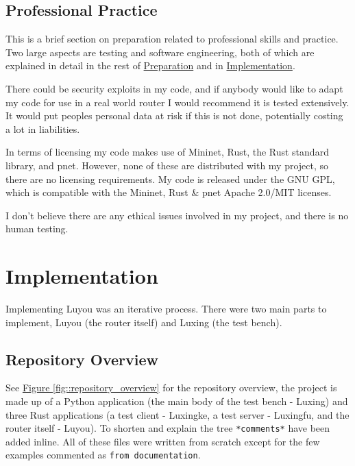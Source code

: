 \documentclass[12pt,a4paper,twoside,openright]{report}
\begin{document}
\section{Professional Practice}
This is a brief section on preparation related to professional skills and practice.  Two large aspects are testing and software engineering, both of which are explained in detail in the rest of \hyperref[chap::preparation]{Preparation} and in \hyperref[chap::implementation]{Implementation}.  

\bigskip

There could be security exploits in my code, and if anybody would like to adapt my code for use in a real world router I would recommend it is tested extensively.  It would put peoples personal data at risk if this is not done, potentially costing a lot in liabilities.

\bigskip

In terms of licensing my code makes use of Mininet, Rust, the Rust standard library, and pnet.  However, none of these are distributed with my project, so there are no licensing requirements. My code is released under the GNU GPL\cite{gpl}, which is compatible with the Mininet, Rust \& pnet Apache 2.0/MIT licenses.

\bigskip

I don't believe there are any ethical issues involved in my project, and there is no human testing.

\chapter{Implementation}
\label{chap::implementation}

Implementing Luyou was an iterative process.  There were two main parts to implement, Luyou (the router itself) and Luxing (the test bench).

\section*{Repository Overview}

See \hyperref[fig::repository_overview]{Figure }\ref{fig::repository_overview} for the repository overview, the project is made up of a Python application (the main body of the test bench - Luxing) and three Rust applications (a test client - Luxingke, a test server - Luxingfu, and the router itself - Luyou). To shorten and explain the tree \verb!*comments*! have been added inline. All of these files were written from scratch except for the few examples commented as \verb!from documentation!. 
\end{document}
